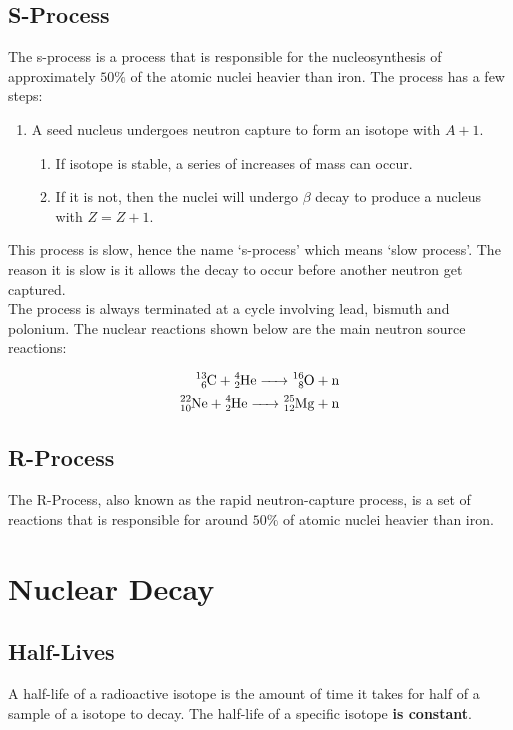 \documentclass{article}
\begin{document}
\begin{multicols*}{2}
    \subsection{S-Process}
    The s-process is a process that is responsible for the nucleosynthesis
    of approximately $50\%$ of the atomic nuclei heavier than iron. The process
    has a few steps:
    \begin{enumerate}
      \item A seed nucleus undergoes neutron capture to form an isotope with $A+1$.
      \begin{enumerate}
        \item If isotope is stable, a series of increases of mass can occur.
        \item If it is not, then the nuclei will undergo $\beta$ decay to produce
        a nucleus with $Z=Z+1$.
      \end{enumerate}
    \end{enumerate}

    This process is slow, hence the name `s-process' which means `slow process'.
    The reason it is slow is it allows the decay to occur before another neutron
    get captured.\\

    The process is always terminated at a cycle involving lead, bismuth and
    polonium. The nuclear reactions shown below are the main neutron source
    reactions:

    \begin{equation*}
      \begin{split}
        \ce{^{13}_{6}C + ^{4}_{2}He -> ^{16}_{8}O + n} \\
        \ce{^{22}_{10}Ne + ^{4}_{2}He -> ^{25}_{12}Mg + n}
      \end{split}
    \end{equation*}
    
    \subsection{R-Process}
    The R-Process, also known as the rapid neutron-capture process, is a set
    of reactions that is responsible for around $50\%$ of atomic nuclei heavier
    than iron.

    \section{Nuclear Decay}
    \subsection{Half-Lives}
    A half-life of a radioactive isotope is the amount of time it takes for
    half of a sample of a isotope to decay. The half-life of a specific
    isotope \textbf{is constant}.\\


\end{multicols*}
\end{document}

